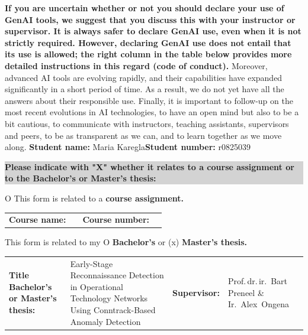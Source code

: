 \textbf{If you are uncertain whether or not you should declare your use of GenAI tools, we suggest that you discuss this with your instructor or supervisor. It is always safer to declare GenAI use, even when it is not strictly required. However, declaring GenAI use does not entail that its use is allowed; the right column in the table below provides more detailed instructions in this regard (code of conduct). }
\newline
\newline
Moreover, advanced AI tools are evolving rapidly, and their capabilities have expanded significantly in a short period of time. As a result, we do not yet have all the answers about their responsible use. Finally, it is important to follow-up on the most recent evolutions in AI technologies, to have an open mind but also to be a bit cautious, to communicate with instructors, teaching assistants, supervisors and peers, to be as transparent as we can, and to learn together as we move along.
\newpage
\noindent
\textbf{Student name:} Maria Karegla\hfill \textbf{Student number:} r0825039

\vspace{1em}

\noindent
\colorbox{lightgray}{\parbox{\dimexpr\linewidth-2\fboxsep\relax}{\textbf{Please indicate with "X" whether it relates to a course assignment or to the Bachelor’s or Master’s thesis:}}}

\vspace{1em}

O This form is related to a \textbf{course assignment.}

\begin{tabularx}{\linewidth}{@{}lXlX@{}}
\textbf{Course name:} & \dotfill & \textbf{Course number:} & \dotfill \\
\end{tabularx}

\vspace{1em}

This form is related to my O \textbf{Bachelor’s} or (x) \textbf{Master’s thesis.}

\begin{tabularx}{\linewidth}{@{}lXlX@{}}
\textbf{Title Bachelor’s or Master’s thesis:} & Early-Stage Reconnaissance Detection in Operational Technology Networks Using Conntrack-Based Anomaly Detection & \textbf{Supervisor:} & Prof.\,dr.\,ir.\ Bart Preneel \& Ir.\ Alex~Ongena \\
\end{tabularx}

